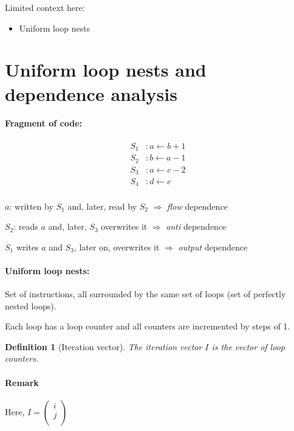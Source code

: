 \documentclass{article}
\newtheorem{defi}{Definition}
\begin{document}
Limited context here:
\begin{itemize}
\item Uniform loop nests
\end{itemize}

\section{Uniform loop nests and dependence analysis}


\paragraph{Fragment of code:}
\begin{align*}
S_1&: a\leftarrow b+1\\
S_2&: b\leftarrow a-1\\
S_3&:a\leftarrow c-2\\
S_4&:d\leftarrow c\\
\end{align*}

$a$: written by $S_1$ and, later, read by $S_2$ $\Rightarrow$ \emph{flow} dependence

$S_2$: reads $a$ and, later, $S_3$ overwrites it $\Rightarrow$ \emph{anti} dependence

$S_1$ writes $a$ and $S_3$, later on, overwrites it $\Rightarrow$ \emph{output} dependence

\paragraph{Uniform loop nests:}
Set of instructions, all surrounded by the same set of loops (set of perfectly nested loops).

\begin{algorithm}
\end{algorithm}

Each loop has a loop counter and all counters are incremented by steps of 1.

\begin{defi}[Iteration vector]
The iteration vector $I$ is the vector of loop counters. 
\end{defi}
\paragraph{Remark}
Here, $I=\begin{pmatrix}
i\\
j\\
\end{pmatrix}$
\end{document}
